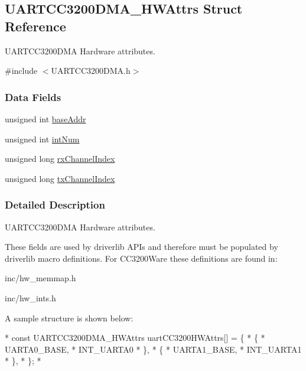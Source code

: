 \subsection{U\-A\-R\-T\-C\-C3200\-D\-M\-A\-\_\-\-H\-W\-Attrs Struct Reference}
\label{struct_u_a_r_t_c_c3200_d_m_a___h_w_attrs}


U\-A\-R\-T\-C\-C3200\-D\-M\-A Hardware attributes.  




{\ttfamily \#include $<$U\-A\-R\-T\-C\-C3200\-D\-M\-A.\-h$>$}

\subsubsection*{Data Fields}
\begin{DoxyCompactItemize}
\item 
unsigned int \hyperlink{struct_u_a_r_t_c_c3200_d_m_a___h_w_attrs_a2ec6b6d7c7fc8b5fc1d6d2159cd4e53e}{base\-Addr}
\item 
unsigned int \hyperlink{struct_u_a_r_t_c_c3200_d_m_a___h_w_attrs_acb9f8b5cc687ee1bf461000f28527440}{int\-Num}
\item 
unsigned long \hyperlink{struct_u_a_r_t_c_c3200_d_m_a___h_w_attrs_a5b8677c50e23d1e44924f4b48ea52eea}{rx\-Channel\-Index}
\item 
unsigned long \hyperlink{struct_u_a_r_t_c_c3200_d_m_a___h_w_attrs_ad61da692da76e9147c1d6eb2bc90669c}{tx\-Channel\-Index}
\end{DoxyCompactItemize}


\subsubsection{Detailed Description}
U\-A\-R\-T\-C\-C3200\-D\-M\-A Hardware attributes. 

These fields are used by driverlib A\-P\-Is and therefore must be populated by driverlib macro definitions. For C\-C3200\-Ware these definitions are found in\-:
\begin{DoxyItemize}
\item inc/hw\-\_\-memmap.\-h
\item inc/hw\-\_\-ints.\-h
\end{DoxyItemize}

A sample structure is shown below\-: 
\begin{DoxyCode}
*  \textcolor{keyword}{const} UARTCC3200DMA_HWAttrs uartCC3200HWAttrs[] = \{
*      \{
*          UARTA0\_BASE,
*          INT\_UARTA0
*      \},
*      \{
*          UARTA1\_BASE,
*          INT\_UARTA1
*      \},
*  \};
*  
\end{DoxyCode}
 

